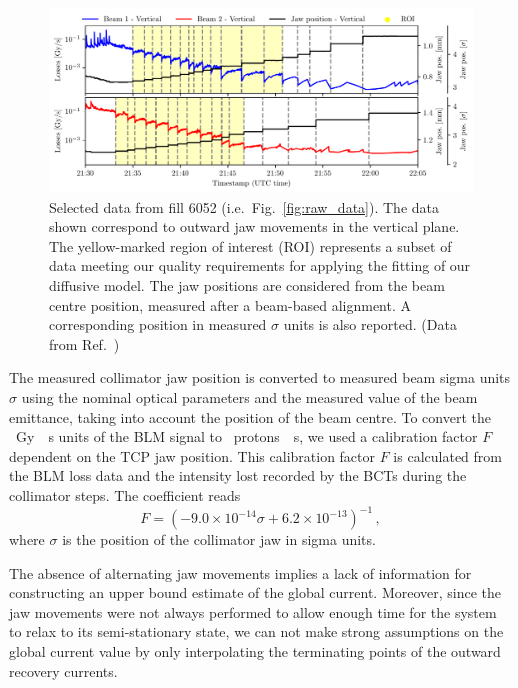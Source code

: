 \begin{figure}[hpt]
    \centering
    \includegraphics[width=\textwidth]{5_Diffusion_measurement_LHC/figs/first.pdf}
    \caption{Selected data from fill 6052 (i.e.\ Fig.~\ref{fig:raw_data}). The data shown correspond to outward jaw movements in the vertical plane. The yellow-marked region of interest (ROI) represents a subset of data meeting our quality requirements for applying the fitting of our diffusive model. The jaw positions are considered from the beam centre position, measured after a beam-based alignment. A corresponding position in measured $\sigma$ units is also reported. (Data from Ref.~\cite{PhysRevAccelBeams.23.044802})}
    \label{fig:first}
\end{figure}


The measured collimator jaw position is converted to measured beam sigma units $\sigma$ using the nominal optical parameters and the measured value of the beam emittance, taking into account the position of the beam centre. To convert the \SI{}{Gy \per s} units of the BLM signal to \SI{}{protons \per s}, we used a calibration factor $F$~\cite{arek} dependent on the TCP jaw position. This calibration factor $F$ is calculated from the BLM loss data and the intensity lost recorded by the BCTs during the collimator steps. The coefficient reads 
\begin{equation}
    F = \left(-9.0\times10^{-14}\sigma + 6.2\times10^{-13}\right)^{-1} \,,
\end{equation}
where $\sigma$ is the position of the collimator jaw in sigma units.

The absence of alternating jaw movements implies a lack of information for constructing an upper bound estimate of the global current. Moreover, since the jaw movements were not always performed to allow enough time for the system to relax to its semi-stationary state, we can not make strong assumptions on the global current value by only interpolating the terminating points of the outward recovery currents. 

